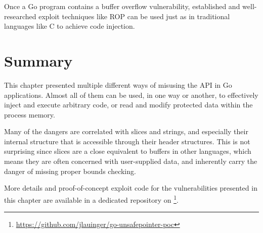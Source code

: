 \begin{insight}
    Once a Go program contains a buffer overflow vulnerability, established and well-researched exploit techniques like
    \acrshort{ROP} can be used just as in traditional languages like C to achieve code injection.
\end{insight}



\section{Summary}\label{sec:unsafe-security-problems:summary}

This chapter presented multiple different ways of misusing the \unsafe{} \acrshort{API} in Go applications.
Almost all of them can be used, in one way or another, to effectively inject and execute arbitrary code, or read and
modify protected data within the process memory.

Many of the dangers are correlated with slices and strings, and especially their internal structure that is accessible
through their header structures.
This is not surprising since slices are a close equivalent to buffers in other languages, which means they are often
concerned with user-supplied data, and inherently carry the danger of missing proper bounds checking.

More details and proof-of-concept exploit code for the vulnerabilities presented in this chapter are available in a
dedicated repository on \github{}\footnote{\url{https://github.com/jlauinger/go-unsafepointer-poc}}.
